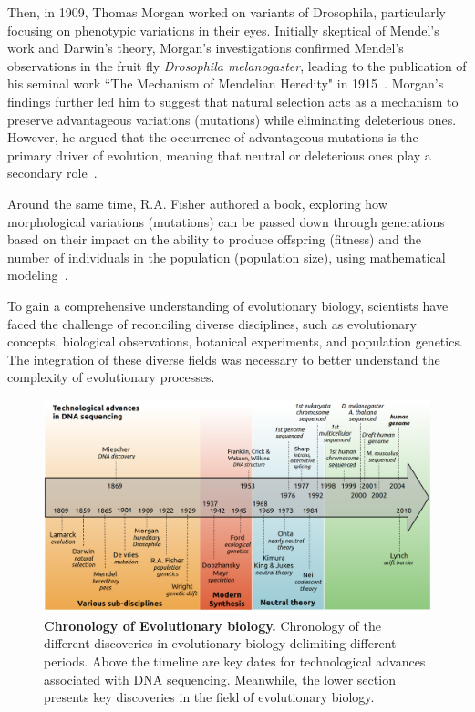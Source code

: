 Then, in 1909, Thomas Morgan worked on variants of Drosophila, particularly focusing on phenotypic variations in their eyes. Initially skeptical of Mendel's work and Darwin's theory, Morgan's investigations confirmed Mendel's observations in the fruit fly \textit{Drosophila melanogaster}, leading to the publication of his seminal work “The Mechanism of Mendelian Heredity" in 1915~\citep{morgan_mechanism_1915}. Morgan's findings further led him to suggest that natural selection acts as a mechanism to preserve advantageous variations (mutations) while eliminating deleterious ones. However, he argued that the occurrence of advantageous mutations is the primary driver of evolution, meaning that neutral or deleterious ones play a secondary role~\citep{morgan_evolution_1925, allen_thomas_1968}.

Around the same time, R.A. Fisher authored a book, exploring how morphological variations (mutations) can be passed down through generations based on their impact on the ability to produce offspring (fitness) and the number of individuals in the population (population size), using mathematical modeling~\citep{fisher_024_1922, crow_perspective_2002, abanda_regulation_2012, charlesworth_fishers_2022}.

To gain a comprehensive understanding of evolutionary biology, scientists have faced the challenge of reconciling diverse disciplines, such as evolutionary concepts, biological observations, botanical experiments, and population genetics. The integration of these diverse fields was necessary to better understand the complexity of evolutionary processes.


\begin{figure}[H]
    \centering
    \includegraphics[width=\linewidth]{figures/chronology_bioevol.png}
    \caption[Chronology of Evolutionary biology]{\textbf{Chronology of Evolutionary biology.} Chronology of the different discoveries in evolutionary biology delimiting different periods. Above the timeline are key dates for technological advances associated with \acrshort{DNA} sequencing. Meanwhile, the lower section presents key discoveries in the field of evolutionary biology.}
    \label{fig:chronology_bioevol}
\end{figure}

